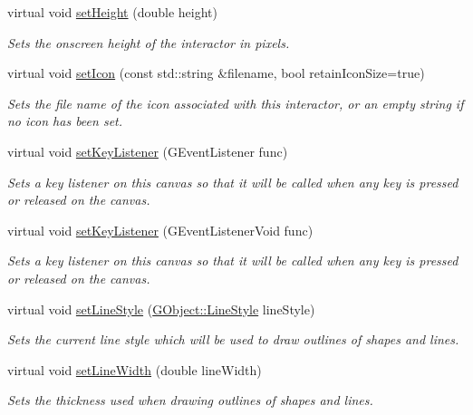 \begin{DoxyCompactItemize}
virtual void \mbox{\hyperlink{classGInteractor_a9e280bfc4544dfaf8e4376c4e1a74357}{set\+Height}} (double height)
\begin{DoxyCompactList}\small\item\em Sets the onscreen height of the interactor in pixels. \end{DoxyCompactList}\item 
virtual void \mbox{\hyperlink{classGInteractor_a762e139aa311461c3984d3ad28293f64}{set\+Icon}} (const std\+::string \&filename, bool retain\+Icon\+Size=true)
\begin{DoxyCompactList}\small\item\em Sets the file name of the icon associated with this interactor, or an empty string if no icon has been set. \end{DoxyCompactList}\item 
virtual void \mbox{\hyperlink{classGCanvas_aeb8324d3287fa1fbe093f4d6230cf0a6}{set\+Key\+Listener}} (G\+Event\+Listener func)
\begin{DoxyCompactList}\small\item\em Sets a key listener on this canvas so that it will be called when any key is pressed or released on the canvas. \end{DoxyCompactList}\item 
virtual void \mbox{\hyperlink{classGCanvas_ae48ecea73606c7bd9423e1c7cc589cc9}{set\+Key\+Listener}} (G\+Event\+Listener\+Void func)
\begin{DoxyCompactList}\small\item\em Sets a key listener on this canvas so that it will be called when any key is pressed or released on the canvas. \end{DoxyCompactList}\item 
virtual void \mbox{\hyperlink{classGDrawingSurface_a6bfe14a77101db0fb97b5a7e07a5526b}{set\+Line\+Style}} (\mbox{\hyperlink{classGObject_a86e0f5648542856159bb40775c854aa7}{G\+Object\+::\+Line\+Style}} line\+Style)
\begin{DoxyCompactList}\small\item\em Sets the current line style which will be used to draw outlines of shapes and lines. \end{DoxyCompactList}\item 
virtual void \mbox{\hyperlink{classGDrawingSurface_afd6a47c6ea6a1f85ca05a65ba3ff3477}{set\+Line\+Width}} (double line\+Width)
\begin{DoxyCompactList}\small\item\em Sets the thickness used when drawing outlines of shapes and lines. \end{DoxyCompactList}\item 

\end{DoxyCompactItemize}
